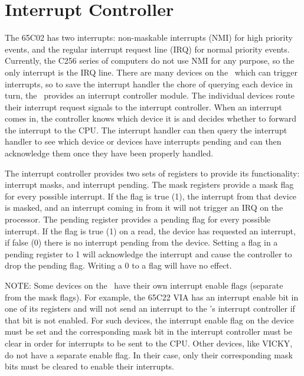 \chapter{Interrupt Controller}

The 65C02 has two interrupts: non-maskable interrupts (NMI) for high priority events, and the regular interrupt request line (IRQ) for normal priority events. Currently, the C256 series of computers do not use NMI for any purpose, so the only interrupt is the IRQ line. There are many devices on the \jr\ which can trigger interrupts, so to save the interrupt handler the chore of querying each device in turn, the \jr\ provides an interrupt controller module.
The individual devices route their interrupt request signals to the interrupt controller. When an interrupt comes in, the controller knows which device it is and decides whether to forward the interrupt to the CPU. The interrupt handler can then query the interrupt handler to see which device or devices have interrupts pending and can then acknowledge them once they have been properly handled.

The interrupt controller provides two sets of registers to provide its functionality: interrupt masks, and interrupt pending. The mask registers provide a mask flag for every possible interrupt. If the flag is true (1), the interrupt from that device is masked, and an interrupt coming in from it will not trigger an IRQ on the processor. The pending register provides a pending flag for every possible interrupt. If the flag is true (1) on a read, the device has requested an interrupt, if false (0) there is no interrupt pending from the device. Setting a flag in a pending register to 1 will acknowledge the interrupt and cause the controller to drop the pending flag. Writing a 0 to a flag will have no effect.

NOTE: Some devices on the \jr\ have their own interrupt enable flags (separate from the mask flags). For example, the 65C22 VIA has an interrupt enable bit in one of its registers and will not send an interrupt to the \jr's interrupt controller if that bit is not enabled. For such devices, the interrupt enable flag on the device must be set and the corresponding mask bit in the interrupt controller must be clear in order for interrupts to be sent to the CPU. Other devices, like VICKY, do not have a separate enable flag. In their case, only their corresponding mask bits must be cleared to enable their interrupts.

